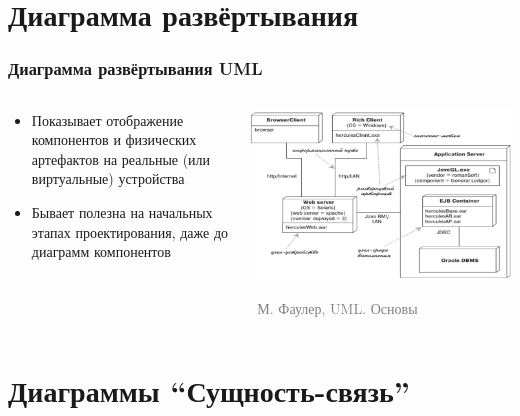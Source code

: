 \documentclass[xetex,mathserif,serif]{beamer}
\newcommand{\attribution}[1] {
    \vspace{-5mm}\begin{flushright}\begin{scriptsize}\textcolor{gray}{\textcopyright\, #1}\end{scriptsize}\end{flushright}
}
\begin{document}
    \section{Диаграмма развёртывания}
    
    \begin{frame}
        \frametitle{Диаграмма развёртывания UML}
        \begin{columns}
            \begin{column}{0.5\textwidth}
                \begin{itemize}
                    \item Показывает отображение компонентов и физических артефактов на реальные (или виртуальные) устройства
                    \item Бывает полезна на начальных этапах проектирования, даже до диаграмм компонентов
                \end{itemize}
            \end{column}
            \begin{column}{0.5\textwidth}
                \begin{center}
                    \includegraphics[width=\textwidth]{deploymentDiagram.png}
                    \attribution{М. Фаулер, UML. Основы}
                \end{center}
            \end{column}
        \end{columns}
    \end{frame}

    \section{Диаграммы ``Сущность-связь''}
\end{document}
